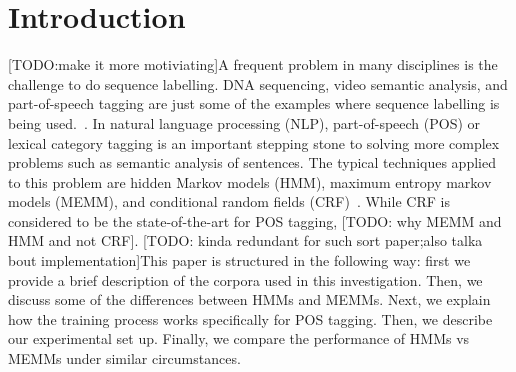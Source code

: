 \section{Introduction}
\label{sec:introduction}
[TODO:make it more motiviating]A frequent problem in many disciplines is the challenge to do sequence labelling. DNA sequencing, video semantic analysis, and part-of-speech tagging are just some of the examples where sequence labelling is being used.~\cite{dnaEx, videoEx, nlpEx}. In natural language processing (NLP), part-of-speech (POS) or lexical category tagging is an important stepping stone to solving more complex problems such as semantic analysis of sentences. The typical techniques applied to this problem are hidden Markov models (HMM), maximum entropy markov models (MEMM), and conditional random fields (CRF)~\cite{nlpBook}. While CRF is considered to be the state-of-the-art for POS tagging, [TODO: why MEMM and HMM and not CRF]. [TODO: kinda redundant for such sort paper;also talka bout implementation]This paper is structured in the following way: first we provide a brief description of the corpora used in this investigation. Then, we discuss some of the differences between HMMs and MEMMs. Next, we explain how the training process works specifically for POS tagging. Then, we describe our experimental set up. Finally, we compare the performance of HMMs vs MEMMs under similar circumstances.
